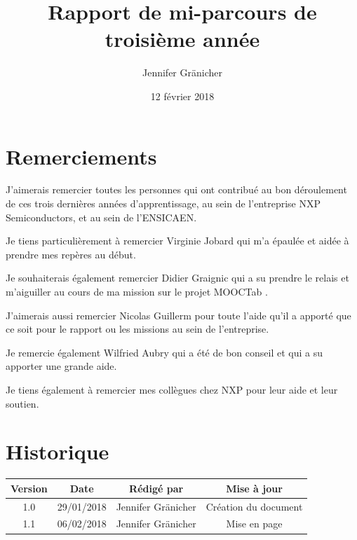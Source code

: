 \documentclass[french,12pt,a4paper,titlepage,openright,openbib]{report}
\title{Rapport de mi-parcours de troisième année}
\author{Jennifer Gr\"{a}nicher}
\date{12 février 2018}
\begin{document}



\maketitle

\chapter*{Remerciements}
J'aimerais remercier toutes les personnes qui ont contribué au bon déroulement de ces trois dernières années d'apprentissage, au sein de l'entreprise NXP Semiconductors, et au sein de l'ENSICAEN.

Je tiens particulièrement à remercier Virginie Jobard qui m'a épaulée et aidée à prendre mes repères au début.

Je souhaiterais également remercier Didier Graignic qui a su prendre le relais et m'aiguiller au cours de ma mission sur le projet MOOCTab \cite{website:mooctab} \cite{website:mooctabitea}.

J'aimerais aussi remercier Nicolas Guillerm pour toute l'aide qu'il a apporté que ce soit pour le rapport ou les missions au sein de l'entreprise.

Je remercie également Wilfried Aubry qui a été de bon conseil et qui a su apporter une grande aide.

Je tiens également à remercier mes collègues chez NXP pour leur aide et leur soutien.

\tableofcontents

\chapter*{Historique}
\begin{table}[ht]
	\label{tab:historique}
	\centering
	\begin{tabular}{|c|c|c|c|}
		\hline
		{\bf Version} & {\bf Date} & {\bf Rédigé par}    & {\bf Mise à jour}    \\
		\hline
		1.0           & 29/01/2018 & Jennifer Gränicher  & Création du document \\
		\hline
		1.1           & 06/02/2018 & Jennifer Gränicher  & Mise en page \\
		\hline
	\end{tabular}
\end{table}

\vspace{2cm}
\end{document}
